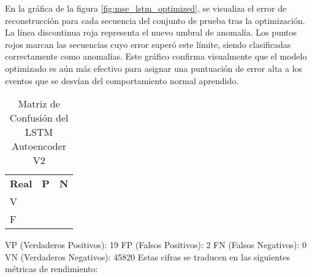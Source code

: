       En la gráfica de la figura \ref{fig:mse_lstm_optimized}, se visualiza el error de reconstrucción para cada secuencia del conjunto de prueba tras la optimización. La línea discontinua roja representa el nuevo umbral de anomalía. Los puntos rojos marcan las secuencias cuyo error superó este límite, siendo clasificadas correctamente como anomalías. Este gráfico confirma visualmente que el modelo optimizado es aún más efectivo para asignar una puntuación de error alta a los eventos que se desvían del comportamiento normal aprendido.

      \begin{table}[ht!]
            \doublespacing
            \small
            \centering
            \begin{tabular}{ >{\centering\arraybackslash}p{3cm} >{\centering\arraybackslash}p{3cm} >{\centering\arraybackslash}p{3cm} }
                  \hline
                                & \multicolumn{2}{c}{\textbf{Esperado}}              \\
                  \hline
                  \textbf{Real} & \textbf{P}                            & \textbf{N} \\
                  \hline
                  V             & 19                                    & 0  \\
                  F             & 2                                     & 45820         \\
                  \hline
            \end{tabular}
            \caption{Matriz de Confusión del LSTM Autoencoder V2}
            \label{tab:confusion_matrix_lstm_optimized}
      \end{table}

      VP (Verdaderos Positivos): 19
      FP (Falsos Positivos): 2
      FN (Falsos Negativos): 0
      VN (Verdaderos Negativos): 45820
      Estas cifras se traducen en las siguientes métricas de rendimiento:

